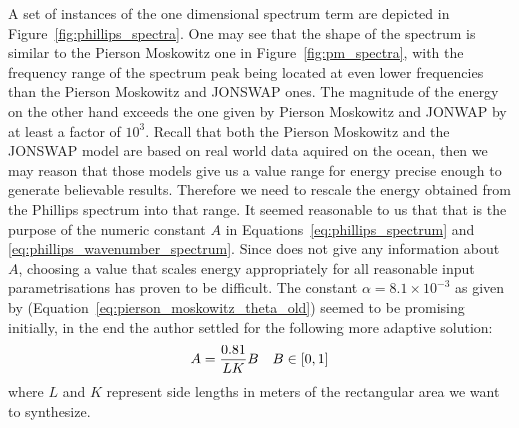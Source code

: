 %
A set of instances of the one dimensional \wavenumber spectrum term are depicted 
in Figure~\ref{fig:phillips_spectra}. One may see that the shape of the 
spectrum is similar to the Pierson Moskowitz one in Figure~\ref{fig:pm_spectra}, 
with the frequency range of the spectrum peak being located at even lower 
frequencies than the Pierson Moskowitz and JONSWAP ones. The magnitude of the 
energy on the other hand exceeds the one given by Pierson Moskowitz and JONWAP 
by at least a factor of $10^3$. Recall that both the Pierson Moskowitz and the 
JONSWAP model are based on real world data aquired on the ocean, then we may 
reason that those models give us a value range for energy precise enough to 
generate believable results. Therefore we need to rescale the energy obtained 
from the Phillips spectrum into that range. It seemed reasonable to us
that that is the purpose of the numeric constant $A$ in 
Equations~\ref{eq:phillips_spectrum} and \ref{eq:phillips_wavenumber_spectrum}. 
Since \citeauthor{course:simulatingocean} does not give any information about
$A$, choosing a value that  scales energy appropriately for all reasonable
input parametrisations has proven to be difficult. The constant
$\alpha = 8.1 \times 10^{-3}$ as given by \citet{article:PiersonMoskowitz1964}
(Equation~\ref{eq:pierson_moskowitz_theta_old}) seemed to be promising
initially, in the end the author settled for the following more adaptive
solution:
\begin{align*}
 A = \frac{0.81}{LK}B && B \in \interval{0}{1}
\end{align*}
where $L$ and $K$ represent side lengths in meters of the rectangular area 
we want to synthesize.
%
